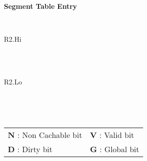 \begin{minipage}{\textwidth}
\begin{framed}
	\begin{center}
		\textbf{Segment Table Entry}
	\end{center}
	\centering
	\ttfamily
	\begin{bytefield}[bitwidth=10px,endianness=big]{32}
		\\
		\begin{rightwordgroup}{R2.Hi}
		   
		\end{rightwordgroup}\\
		\\
		\begin{rightwordgroup}{R2.Lo}
		     
		\end{rightwordgroup}\\
	\end{bytefield}\\
	\begin{tabular}{ll}
	\textbf{N} : Non Cachable bit & \textbf{V} : Valid bit \\
	\textbf{D} : Dirty bit & \textbf{G} : Global bit \\
	\end{tabular}
\end{framed}
\end{minipage}
